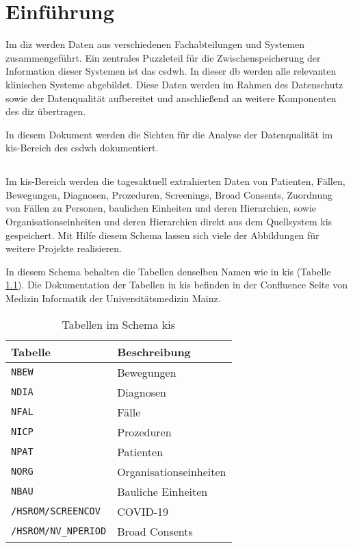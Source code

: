 \chapter{Einführung} \label{chp:intro}

Im \ac{diz} werden Daten aus verschiedenen Fachabteilungen und Systemen zusammengeführt. Ein zentrales Puzzleteil für die Zwischenspeicherung der Information dieser Systemen ist das \acf{csdwh}. In dieser \ac{db} werden alle relevanten klinischen Systeme abgebildet. Diese Daten werden im Rahmen des Datenschutz sowie der Datenqualität aufbereitet und anschließend an weitere Komponenten des \ac{diz} übertragen.

In diesem Dokument werden die Sichten für die Analyse der Datenqualität im \ac{kis}-Bereich des \ac{csdwh} dokumentiert.

\section{}

 Im \ac{kis}-Bereich werden die tagesaktuell extrahierten Daten von Patienten, Fällen, Bewegungen, Diagnosen, Prozeduren, Screenings, Broad Consents, Zuordnung von Fällen zu Personen, baulichen Einheiten und deren Hierarchien, sowie Organisationseinheiten und deren Hierarchien direkt aus dem Quellsystem \ac{kis} gespeichert. Mit Hilfe diesem Schema lassen sich viele der Abbildungen für weitere Projekte realisieren.
 
 In diesem Schema behalten die Tabellen denselben Namen wie in \ac{kis} (Tabelle \ref{tab:schemaKis}). Die Dokumentation der Tabellen in \ac{kis} befinden in der Confluence Seite von Medizin Informatik der Universitätsmedizin Mainz.
 
 \begin{table}[ht]
 	\centering   
 	\caption{Tabellen im Schema \acs{kis}}
 	\label{tab:schemaKis}
 	\begin{tabular}{||l|l||}   		
 		\hline
 		Tabelle & Beschreibung \\ [0.5ex]
 		\hline\hline
 		\texttt{NBEW} & Bewegungen \\
 		\hline
 		\texttt{NDIA} & Diagnosen \\
 		\hline
 		\texttt{NFAL} & Fälle \\
 		\hline
 		\texttt{NICP} & Prozeduren \\
 		\hline
 		\texttt{NPAT} & Patienten \\
 		\hline
 		\texttt{NORG} & Organisationseinheiten \\
 		\hline
 		\texttt{NBAU} & Bauliche Einheiten \\
 		\hline
 		\texttt{/HSROM/SCREENCOV} & COVID-19 \\
 		\hline
 		\texttt{/HSROM/NV\_NPERIOD} & Broad Consents \\
 		\hline
 	\end{tabular}
 \end{table}